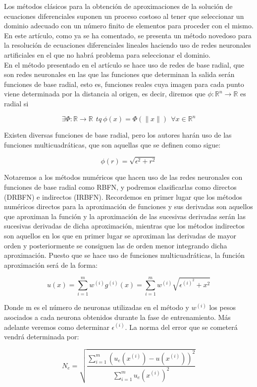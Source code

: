 \documentclass[12pt]{article}       %
\begin{document}
Los métodos clásicos para la obtención de aproximaciones de la solución de ecuaciones diferenciales suponen un proceso costoso al tener que seleccionar un dominio adecuado con un número finito de elementos para proceder con el mismo. En este artículo, como ya se ha comentado, se presenta un método novedoso para la resolución de ecuaciones diferenciales lineales haciendo uso de redes neuronales artificiales en el que no habrá problema para seleccionar el dominio. \\

En el método presentado en el artículo se hace uso de redes de base radial, que son redes neuronales en las que las funciones que determinan la salida serán funciones de base radial, esto es, funciones reales cuya imagen para cada punto viene determinada por la distancia al origen, es decir, diremos que $\phi:\mathbb{R}^n\to \mathbb{R} $  es radial si

$$\exists \Phi:\mathbb{R}\to \mathbb{R}\ \ tq\ \phi(x)=\Phi(\parallel x\parallel)\ \ \forall x\in\mathbb{R}^n$$

Existen diversas funciones de base radial, pero los autores harán uso de las funciones multicuadráticas, que son aquellas que se definen como sigue:

$$\phi(r) = \sqrt{\epsilon^2+r^2}$$

Notaremos a los métodos numéricos que hacen uso de las redes neuronales con funciones de base radial como RBFN, y podremos clasificarlas como directos (DRBFN) e indirectos (IRBFN). Recordemos en primer lugar que los métodos numéricos directos para la aproximación de funciones y sus derivadas son aquellos que aproximan la función y la aproximación de las sucesivas derivadas serán las sucesivas derivadas de dicha aproximación, mientras que los métodos indirectos son aquellos en los que en primer lugar se aproximan las derivadas de mayor orden y posteriormente se consiguen las de orden menor integrando dicha aproximación. Puesto que se hace uso de funciones multicuadráticas, la función aproximación será de la forma:

$$ u(x) = \sum\limits_{i=1}^{m} w^{(i)}g^{(i)}(x) = \sum\limits_{i=1}^{m} w^{(i)}\sqrt{\epsilon^{(i)^2}+x^2}$$

Donde m es el número de neuronas utilizadas en el método y $w^{(i)}$ los pesos asociados a cada neurona obtenidos durante la fase de entrenamiento. Más adelante veremos como determinar $\epsilon^{(i)}$. La norma del error que se cometerá vendrá determinada por:

$$N_e = \sqrt{\frac{\sum\limits_{i=1}^{m}(u_e(x^{(i)})-u(x^{(i)}))^2}{\sum\limits_{i=1}^{m}u_e(x^{(i)})^2}}$$
\end{document}
